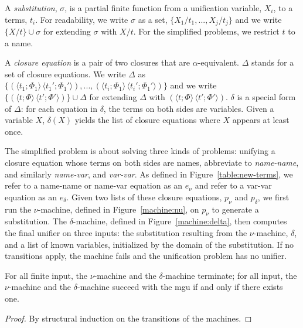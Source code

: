 \documentclass[a4paper,UKenglish]{lipics-v2016}
\newcommand{\clos}[2] {
  \langle #1; #2 \rangle
}
\newcommand{\pr}[2] {
 (#1\, #2)
}
\newcommand{\bd}[2] {
 #1/ #2
}
\begin{document}
A \emph{substitution}, $\sigma$, is a partial finite function from
a unification variable,
  $X_i$, to a terms, $t_i$.  For readability, we write $\sigma$ as a
  set, $\{\bd{X_1}{t_1}, ..., \bd{X_j}{t_j}\}$ and we write
  $\{\bd{X}{t}\} \cup \sigma$ for extending $\sigma$ with $\bd{X}{t}$.
  For the simplified problems, we restrict $t$ to a name.

  A \emph{closure equation} is a pair of two closures that are
  $\alpha$-equivalent. $\Delta$ stands for a set of closure equations.
  We write $\Delta$ as $\{\pr{\clos{t_1}{\Phi_1}}{\clos{t_1'}{\Phi_1'}},
  ..., \pr{\clos{t_i}{\Phi_1}}{\clos{t_i'}{\Phi_1'}}\}$ and we write
  $\{\pr{\clos{t}{\Phi}}{\clos{t'}{\Phi'}}\}\cup\Delta$ for extending
  $\Delta$ with $\pr{\clos{t}{\Phi}}{\clos{t'}{\Phi'}}$. 
  $\delta$ is a special form of $\Delta$: for each equation in
  $\delta$, the terms on both sides are variables.
  Given a variable $X$, $\delta(X)$ yields the list of
  closure equations where $X$ appears at least once.

  The simplified problem is about solving three kinds of problems:
  unifying a closure equation whose terms on both sides are names,
  abbreviate to \emph{name-name},
  and similarly \emph{name-var}, and \emph{var-var}.
As defined in Figure~\ref{table:new-terms},
we refer to a name-name or name-var equation as
an \emph{$e_\nu$} and refer to a
var-var equation as an \emph{$e_\delta$}.
Given two lists of these closure equations,
$p_\nu$ and $p_\delta$,
we first run the
$\nu$-machine, defined in Figure~\ref{machine:nu},
on $p_\nu$ to generate a substitution.
The $\delta$-machine, defined in Figure~\ref{machine:delta},
then computes the final unifier on three inputs:
the substitution resulting from the $\nu$-machine,
$\delta$, and a list of known variables, initialized by
the domain of the substitution.
If no transitions apply, the machine
fails and the unification problem has no unifier.


\begin{lemma}\label{lemma:numachine}
 For all finite input, the $\nu$-machine and the $\delta$-machine
 terminate; for all input, the $\nu$-machine and the $\delta$-machine
 succeed with the mgu if and only if there exists one.
\end{lemma}
\begin{proof}
    By structural induction on the transitions of the machines.
\end{proof}
\end{document}
